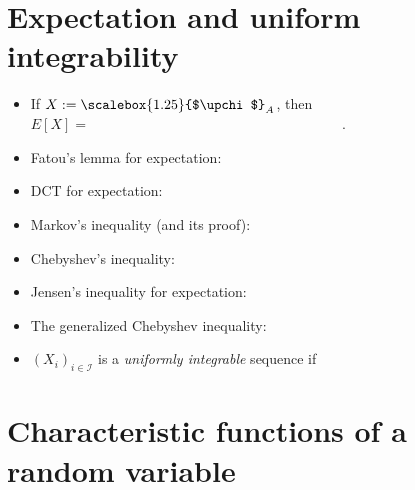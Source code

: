 \documentclass[12pt,reqno]{article}
\renewcommand{\emph}[1]{\textit{#1}}
\theoremstyle{plain}
\theoremstyle{definition}
\renewcommand{\chi}{\scalebox{1.25}{$\upchi$}}
\begin{document}
\section{Expectation and uniform integrability} 

\begin{itemize} 

\item If $X := \chi_{A}$, then $E[X] = \hspace{3in}$. 
\item Fatou's lemma for expectation: 
\item DCT for expectation: 
\item Markov's inequality (and its proof): \\ 
\item Chebyshev's inequality: \\ 
\item Jensen's inequality for expectation: \\ 
\item The generalized Chebyshev inequality: \\ 
\item $(X_i)_{i \in \mathcal{I}}$ is a \emph{uniformly integrable} sequence if \\ 

\end{itemize} 

\section{Characteristic functions of a random variable} 
\end{document}
